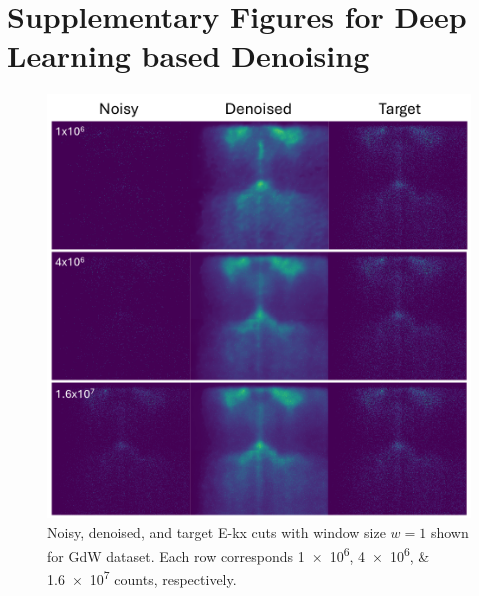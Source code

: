 \section{Supplementary Figures for Deep Learning based Denoising}
\begin{figure}[h]
    \centering
    \includegraphics[width=1\linewidth]{images/nn_denoised_ex_single_slice.pdf}
    \caption{Noisy, denoised, and target \gls{E}-\gls{kx} cuts with window size $w=1$ shown for \gls{GdW} dataset. Each row corresponds \numlist{1e6;4e6;1.6e7} counts, respectively.}
    \label{fig:nn-denoised-ex-single-slice}
\end{figure}

